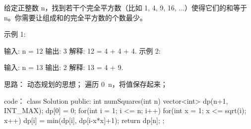 给定正整数 n，找到若干个完全平方数（比如 1, 4, 9, 16, ...）使得它们的和等于 n。你需要让组成和的完全平方数的个数最少。

示例 1:

输入: n = 12
输出: 3 
解释: 12 = 4 + 4 + 4.
示例 2:

输入: n = 13
输出: 2
解释: 13 = 4 + 9.


























思路：
动态规划的思想；
遍历 0~n，将值保存起来；


























code：
class Solution {
public:
    int numSquares(int n) {
        vector<int> dp(n+1, INT_MAX);
        dp[0] = 0;
        for(int i = 1; i <= n; i++)
        {
            for(int x = 1; x <= sqrt(i); x++)
            {
                dp[i] = min(dp[i], dp[i-x*x]+1);
            }
        }
        return dp[n];
    }
};